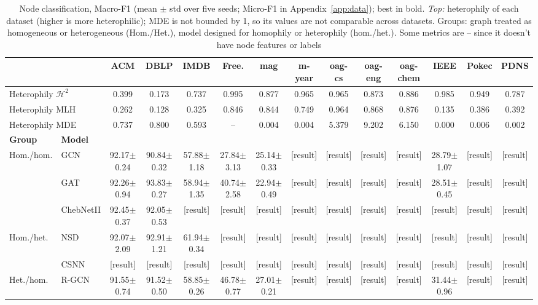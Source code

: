 \documentclass{article}
\newcommand{\res}{{\scriptsize[result]}}
\begin{document}
\begin{table}[!htbp]
  \centering
  \caption{Node classification, Macro-F1 (mean $\pm$ std over five seeds; Micro-F1 in Appendix~\ref{app:data}); best in bold. \emph{Top:} heterophily of each dataset (higher is more heterophilic); MDE is not bounded by 1, so its values are not comparable across datasets. Groups: graph treated as homogeneous or heterogeneous (Hom./Het.), model designed for homophily or heterophily (hom./het.). Some metrics are -- since it doesn't have node features or labels}

  \label{tab:node-cls}
  \scriptsize
  \setlength{\tabcolsep}{2.6pt}
  \begin{tabular}{llcccccccccccc}
    \toprule
    & & ACM & DBLP & IMDB & Free. & mag & m-year & oag-cs & oag-eng & oag-chem & IEEE & Pokec & PDNS \\
    \midrule
    \multicolumn{2}{l}{Heterophily $\mathcal{H}^2$} & 0.399 & 0.173 & 0.737 & 0.995 & 0.877 & 0.965 & 0.965 & 0.873 & 0.886 & 0.985 & 0.949 & 0.787 \\
    \multicolumn{2}{l}{Heterophily MLH} & 0.262 & 0.128 & 0.325 & 0.846 & 0.844 & 0.749 & 0.964 & 0.868 & 0.876 & 0.135 & 0.386 & 0.392 \\
    \multicolumn{2}{l}{Heterophily MDE} & 0.737 & 0.800 & 0.593 & -- & 0.004 & 0.004 & 5.379 & 9.202 & 6.150 & 0.000 & 0.006 & 0.002 \\
    \midrule
    \textbf{Group} & \textbf{Model} & & & & & & & & & & & & \\
    \midrule
    \multirow{3}{*}{Hom./hom.} & GCN & 92.17$\pm$0.24 & 90.84$\pm$0.32 & 57.88$\pm$1.18 & 27.84$\pm$3.13 & 25.14$\pm$0.33 & \res & \res & \res & \res & 28.79$\pm$1.07 & \res & \res \\
    & GAT & 92.26$\pm$0.94 & 93.83$\pm$0.27 & 58.94$\pm$1.35 & 40.74$\pm$2.58 & 22.94$\pm$0.49 & \res & \res & \res & \res & 28.51$\pm$0.45 & \res & \res \\
    & ChebNetII & 92.45$\pm$0.37 & 92.05$\pm$0.53 & \res & \res & \res & \res & \res & \res & \res & \res & \res & \res \\
    \midrule
    \multirow{2}{*}{Hom./het.} & NSD & 92.07$\pm$2.09 & 92.91$\pm$1.21 & 61.94$\pm$0.34 & \res & \res & \res & \res & \res & \res & \res & \res & \res \\
    & CSNN & \res & \res & \res & \res & \res & \res & \res & \res & \res & \res & \res & \res \\
    \midrule
    \multirow{6}{*}{Het./hom.} & R-GCN & 91.55$\pm$0.74 & 91.52$\pm$0.50 & 58.85$\pm$0.26 & 46.78$\pm$0.77 & 27.01$\pm$0.21 & \res & \res & \res & \res & 31.44$\pm$0.96 & \res & \res \\

\end{tabular}
\end{table}
\end{document}
